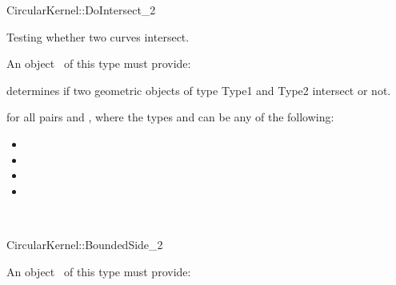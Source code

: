 \begin{ccRefFunctionObjectConcept}{CircularKernel::DoIntersect_2}

\ccDefinition

Testing whether two curves intersect.

\ccRefines



An object \ccVar\ of this type must provide:

{determines if two geometric objects of type Type1 and Type2 intersect or not.}

for all pairs  and , where the types 
 and  can be any of the following:
\begin{itemize}
\item {} 
\item {} 
\item {} 
\item {} 
\end{itemize} 

\ccSeeAlso

\\

\end{ccRefFunctionObjectConcept}
\begin{ccRefFunctionObjectConcept}{CircularKernel::BoundedSide_2}

\ccRefines



An object \ccVar\ of this type must provide:

{}

\ccSeeAlso

\\

\end{ccRefFunctionObjectConcept}
